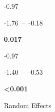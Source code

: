 \documentclass[
  letterpaper,
  DIV=11,
  numbers=noendperiod]{scrartcl}
\begin{document}
\begin{table}
\begin{minipage}[t]{\linewidth}
{\centering 

-0.97

}

\end{minipage}%
\newline
\begin{minipage}[t]{\linewidth}

{\centering 

-1.76~--~-0.18

}

\end{minipage}%
\newline
\begin{minipage}[t]{\linewidth}

{\centering 

\textbf{0.017}

}

\end{minipage}%
\newline
\begin{minipage}[t]{\linewidth}

{\centering 

-0.97

}

\end{minipage}%
\newline
\begin{minipage}[t]{\linewidth}

{\centering 

-1.40~--~-0.53

}

\end{minipage}%
\newline
\begin{minipage}[t]{\linewidth}

{\centering 

\textbf{\textless0.001}

}

\end{minipage}%
\newline
\begin{minipage}[t]{\linewidth}

{\centering 

Random Effects

}

\end{minipage}%
\newline
\begin{minipage}[t]{\linewidth}

{\centering 

}
\end{minipage}
\end{table}
\end{document}
